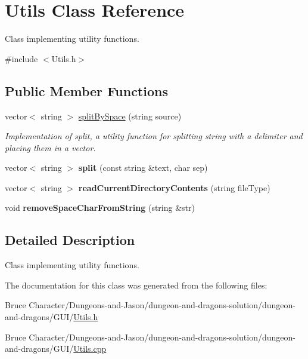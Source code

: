 \hypertarget{class_utils}{}\section{Utils Class Reference}
\label{class_utils}


Class implementing utility functions.  




{\ttfamily \#include $<$Utils.\+h$>$}

\subsection*{Public Member Functions}
\begin{DoxyCompactItemize}
\item 
\hypertarget{class_utils_ab41de8d4d2935983cc9c394f8cf46d14}{}\label{class_utils_ab41de8d4d2935983cc9c394f8cf46d14} 
vector$<$ string $>$ \hyperlink{class_utils_ab41de8d4d2935983cc9c394f8cf46d14}{split\+By\+Space} (string source)
\begin{DoxyCompactList}\small\item\em Implementation of split, a utility function for splitting string with a delimiter and placing them in a vector. \end{DoxyCompactList}\item 
\hypertarget{class_utils_a88738d1f41766430721fd19f2f0e11d0}{}\label{class_utils_a88738d1f41766430721fd19f2f0e11d0} 
vector$<$ string $>$ {\bfseries split} (const string \&text, char sep)
\item 
\hypertarget{class_utils_a7c00ae4f46e6ba54f5a93b0a21249a90}{}\label{class_utils_a7c00ae4f46e6ba54f5a93b0a21249a90} 
vector$<$ string $>$ {\bfseries read\+Current\+Directory\+Contents} (string file\+Type)
\item 
\hypertarget{class_utils_ae319f3832671628b16dbe6f2c4b517da}{}\label{class_utils_ae319f3832671628b16dbe6f2c4b517da} 
void {\bfseries remove\+Space\+Char\+From\+String} (string \&str)
\end{DoxyCompactItemize}


\subsection{Detailed Description}
Class implementing utility functions. 

The documentation for this class was generated from the following files\+:\begin{DoxyCompactItemize}
\item 
Bruce Character/\+Dungeons-\/and-\/\+Jason/dungeon-\/and-\/dragons-\/solution/dungeon-\/and-\/dragons/\+G\+U\+I/\hyperlink{_utils_8h}{Utils.\+h}\item 
Bruce Character/\+Dungeons-\/and-\/\+Jason/dungeon-\/and-\/dragons-\/solution/dungeon-\/and-\/dragons/\+G\+U\+I/\hyperlink{_utils_8cpp}{Utils.\+cpp}\end{DoxyCompactItemize}
